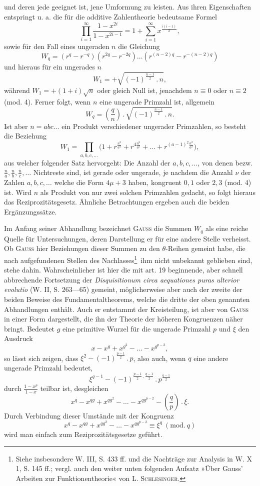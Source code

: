 und deren jede geeignet ist, jene Umformung zu leisten. Aus ihren Eigenschaften entspringt u. a. die für die additive Zahlentheorie bedeutsame Formel
\[
\prod_{i=1}^{\infty}\frac{1-x^{2i}}{1-x^{2i-1}}=1+\sum_{i=1}^{\infty}x^{\frac{i(i-1)}{2}},
\]
sowie für den Fall eines ungeraden \(n\) die Gleichung
\[
W_q=(r^q-r^{-q})(r^{2q}-r^{-2q})\ldots(r^{(n-2)q}-r^{-(n-2)q})
\]
und hieraus für ein ungerades \(n\)
\[
W_1=+\sqrt{(-1)^{\frac{n-1}{2}}\mathbin{.}n},
\]
während \(W_1=+(1+i)\sqrt{n}\) oder gleich Null ist, jenachdem \(n\equiv0\) oder \(n\equiv2\) (mod. 4). Ferner folgt, wenn \(n\) eine ungerade Primzahl ist, allgemein
\[
W_q=\left(\frac{q}{n}\right)\mathbin{.}\sqrt{(-1)^{\frac{n-1}{2}}\mathbin{.}n}.
\]
\newpage{}
\noindent Ist aber \(n=abc\ldots\) ein Produkt verschiedener ungerader Primzahlen, so besteht die Beziehung
\[
W_1=\prod_{a,b,c,\ldots}\biggl(1+r^{\frac{n^2}{a^2}}+r^{4\frac{n^2}{a^2}}+\ldots+r^{(a-1)^2\frac{n^2}{a^2}}\biggr),
\]
aus welcher folgender Satz hervorgeht: Die Anzahl der \(a,b,c,\ldots\), von denen bezw. \(\frac{n}{a},\frac{n}{b},\frac{n}{c},\ldots\) Nichtreste sind, ist gerade oder ungerade, je nachdem die Anzahl \(\nu\) der Zahlen \(a,b,c,\ldots\) welche die Form \(4\mu+3\) haben, kongruent \(0,1\) oder \(2,3\) (mod. 4) ist. Wird \(n\) als Produkt von nur zwei solchen Primzahlen gedacht, so folgt hieraus das Reziprozitätsgesetz. Ähnliche Betrachtungen ergeben auch die beiden Ergänzungssätze.

Im Anfang seiner Abhandlung bezeichnet \textsc{Gauss} die Summen \(W_q\) als eine reiche Quelle für Untersuchungen, deren Darstellung er für eine andere Stelle verheisst. Ob \textsc{Gauss} hier Beziehungen dieser Summen zu den \(\theta\)-Reihen gemeint habe, die nach aufgefundenen Stellen des Nachlasses\footnote{Siehe insbesondere W. III, S. 433 ff. und die Nachträge zur Analysis in W. X 1, S. 145 ff.; vergl. auch den weiter unten folgenden Aufsatz »Über Gauss’ Arbeiten zur Funktionentheorie« von L. \textsc{Schlesinger}.}\ ihm nicht unbekannt geblieben sind, stehe dahin. Wahrscheinlicher ist hier die mit art. 19 beginnende, aber schnell abbrechende Fortsetzung der \textit{Disquisitionum circa aequationes puras ulterior evolutio} (W. II, S. 263—65) gemeint, möglicherweise aber auch der zweite der beiden Beweise des Fundamentaltheorems, welche die dritte der oben genannten Abhandlungen enthält. Auch er entstammt der Kreisteilung, ist aber von \textsc{Gauss} in einer Form dargestellt, die ihn der Theorie der höheren Kongruenzen näher bringt. Bedeutet \(g\) eine primitive Wurzel für die ungerade Primzahl \(p\) und \(\xi\) den Ausdruck
\[
x-x^g+x^{g^2}-\ldots-x^{g^{p-2}},
\]
so lässt sich zeigen, dass \(\xi^2-(-1)^{\frac{p-1}{2}}\mathbin{.}p\), also auch, wenn \(q\) eine andere ungerade Primzahl bedeutet,
\[
\xi^{q-1}-(-1)^{\frac{p-1}{2}\mathbin{.}\frac{q-1}{2}}\mathbin{.}p^{\frac{q-1}{2}}
\]
durch \(\frac{1-x^p}{1-x}\) teilbar ist, desgleichen
\newpage{}
\[
x^q-x^{qg}+x^{qg^2}-\ldots-x^{qg^{p-2}}-\left(\frac{q}{p}\right)\mathbin{.}\xi.
\]
Durch Verbindung dieser Umstände mit der Kongruenz
\[
x^q-x^{qg}+x^{qg^2}-\ldots-x^{qg^{p-2}}\equiv\xi^q\ (\mathrm{mod.}\ q)
\]
wird man einfach zum Reziprozitätsgesetze geführt.
